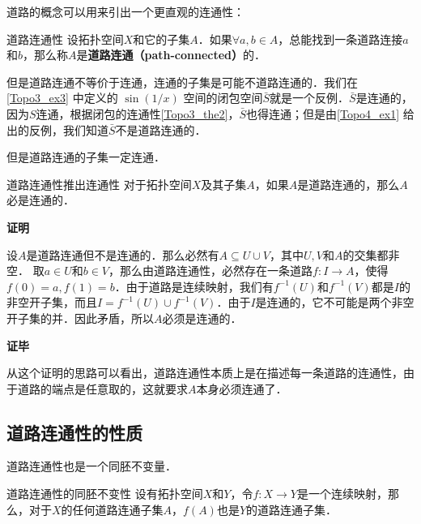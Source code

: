 道路的概念可以用来引出一个更直观的连通性：

\begin{definition}{道路连通性}\label{Topo4_def2}
设拓扑空间$X$和它的子集$A$．如果$\forall a, b\in A$，总能找到一条道路连接$a$和$b$，那么称$A$是\textbf{道路连通（path-connected）}的．
\end{definition}

但是道路连通不等价于连通，连通的子集是可能不道路连通的．我们在\autoref{Topo3_ex3} 中定义的 $\sin(1/x)$ 空间的闭包空间$\bar{S}$就是一个反例．$\bar{S}$是连通的，因为$S$连通，根据闭包的连通性\autoref{Topo3_the2}，$\bar{S}$也得连通；但是由\autoref{Topo4_ex1} 给出的反例，我们知道$\bar{S}$不是道路连通的．

但是道路连通的子集一定连通．

\begin{theorem}{道路连通性推出连通性}\label{Topo4_the1}
对于拓扑空间$X$及其子集$A$，如果$A$是道路连通的，那么$A$必是连通的．
\end{theorem}

\textbf{证明}

设$A$是道路连通但不是连通的．那么必然有$A\subseteq U\cup V$，其中$U, V$和$A$的交集都非空．
取$a\in U$和$b\in V$，那么由道路连通性，必然存在一条道路$f:I\rightarrow A$，使得$f(0)=a, f(1)=b$．由于道路是连续映射，我们有$f^{-1}(U)$和$f^{-1}(V)$都是$I$的非空开子集，而且$I=f^{-1}(U)\cup f^{-1}(V)$．由于$I$是连通的，它不可能是两个非空开子集的并．因此矛盾，所以$A$必须是连通的．

\textbf{证毕}

从这个证明的思路可以看出，道路连通性本质上是在描述每一条道路的连通性，由于道路的端点是任意取的，这就要求$A$本身必须连通了．

\subsection{道路连通性的性质}

道路连通性也是一个同胚不变量．

\begin{theorem}{道路连通性的同胚不变性}
设有拓扑空间$X$和$Y$，令$f:X\rightarrow Y$是一个连续映射，那么，对于$X$的任何道路连通子集$A$，$f(A)$也是$Y$的道路连通子集．
\end{theorem}